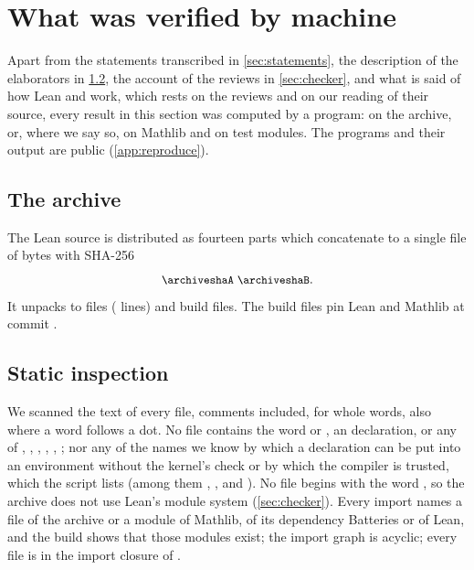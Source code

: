 \section{What was verified by machine}\label{sec:verification}

Apart from the statements transcribed in \cref{sec:statements}, the description of the
elaborators in \cref{sec:scan}, the account of the reviews in \cref{sec:checker}, and what
is said of how Lean and  work, which rests on the reviews and on our reading
of their source, every result in this section was computed by a program: on the archive, or,
where we say so, on Mathlib and on test modules. The programs and their output are public
(\cref{app:reproduce}).

\subsection{The archive}
The Lean source is distributed as fourteen parts which concatenate to a single file
 of \archivebytes{} bytes with SHA-256
\[
\text{\small\ttfamily \archiveshaA}\;\text{\small\ttfamily \archiveshaB}.
\]
It unpacks to \filecount{}  files (\linecount{} lines) and \otherfiles{} build
files. The build files pin Lean \leanversion{} and Mathlib at commit
{\small\ttfamily \mathlibrev}.

\subsection{Static inspection}\label{sec:scan}
We scanned the text of every file, comments included, for whole words, also where a word
follows a dot. No file contains the word  or , an 
declaration, or any of , , ,
, , ; nor any of the names we know by which a
declaration can be put into an environment without the kernel's check or by which the
compiler is trusted, which the script lists (among them ,
,  and ). No file begins with
the word , so the archive does not use Lean's module system
(\cref{sec:checker}). Every import names a file of the archive or a module of Mathlib, of its
dependency Batteries or of Lean, and the build shows that those modules exist; the import
graph is acyclic; every file is in the import closure of .

